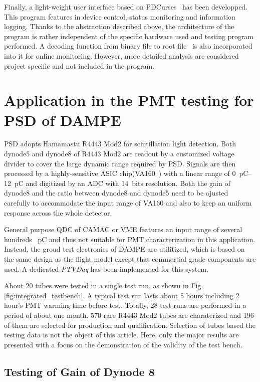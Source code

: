 \documentclass[5p, times]{elsarticle}
\begin{document}
Finally, a light-weight user interface based on PDCurses~\cite{pdcurses} has been developped.
This program features in device control, status monitoring and information logging.
Thanks to the abstraction described above, the architecture of the program is rather independent of the specific hardware used and testing program performed.
A decoding function from binary file to root file~\cite{root} is also incorporated into it for online monitoring.
However, more detailed analysis are considered project specific and not included in the program. 

\section{Application in the PMT testing for PSD of DAMPE}
\label{sec:application}

PSD adopts Hamamastu R4443 Mod2 for scintillation light detection. 
Both dynode5 and dynode8 of R4443 Mod2 are readout by a customized voltage divider to cover the large dynamic range required by PSD.
Signals are then processed by a highly-sensitive ASIC chip(VA160~\cite{va160}) with a linear range of \SIrange{0}{12}{\pico\coulomb} and digitized by an ADC with 14~bits resolution.
Both the gain of dynode8 and the ratio between dynode8 and dynode5 need to be ajusted carefully to accommodate the input range of VA160 and also to keep an uniform response across the whole detector.

General purpose QDC of CAMAC or VME features an input range of several hundreds \SI{}{\pico\coulomb} and thus not suitable for PMT characterization in this application.
Instead, the groud test electronics of DAMPE are utilitized, which is based on the same design as the flight model except that commertial grade components are used.
A dedicated \textit{PTVDaq} has been implemented for this system.

About 20 tubes were tested in a single test run, as shown in Fig.\ref{fig:integrated_testbench}.
A typical test run lasts about 5 hours including 2 hour's PMT warming time before test.
Totally, 28 test runs are performed in a period of about one month.
570 rare R4443 Mod2 tubes are charaterized and 196 of them are selected for production and qualification.
Selection of tubes based the testing data is not the object of this article.
Here, only the major results are presented with a focus on the demonstration of the validity of the test bench. 

\subsection{Testing of Gain of Dynode 8}
\label{sec:psd_gain}
\end{document}
